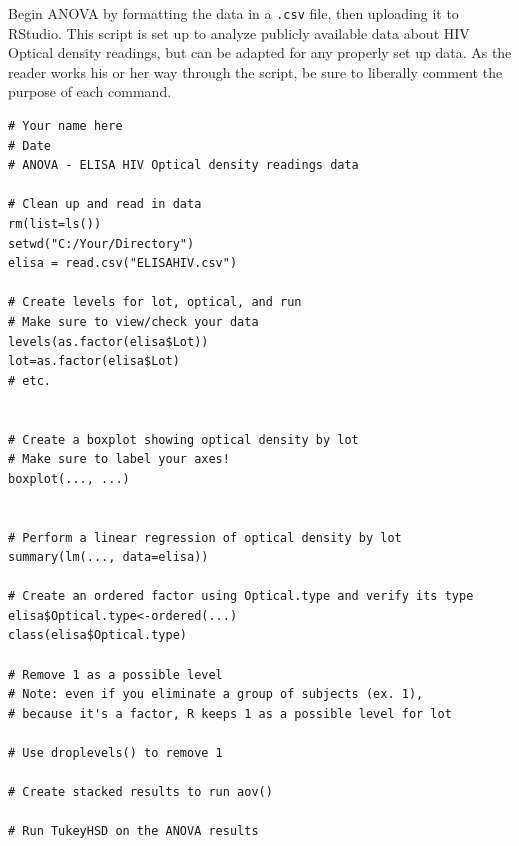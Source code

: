 Begin ANOVA by formatting the data in a \texttt{.csv} file, then uploading it to RStudio.
This script is set up to analyze publicly available data about HIV Optical density readings, but can be adapted for any properly set up data. 
As the reader works his or her way through the script, be sure to liberally comment the purpose of each command. 

\begin{lstlisting}
# Your name here
# Date
# ANOVA - ELISA HIV Optical density readings data

# Clean up and read in data
rm(list=ls())
setwd("C:/Your/Directory")
elisa = read.csv("ELISAHIV.csv")

# Create levels for lot, optical, and run
# Make sure to view/check your data
levels(as.factor(elisa$Lot))
lot=as.factor(elisa$Lot)
# etc.


# Create a boxplot showing optical density by lot
# Make sure to label your axes!
boxplot(..., ...)


# Perform a linear regression of optical density by lot
summary(lm(..., data=elisa))

# Create an ordered factor using Optical.type and verify its type
elisa$Optical.type<-ordered(...)
class(elisa$Optical.type)

# Remove 1 as a possible level
# Note: even if you eliminate a group of subjects (ex. 1),
# because it's a factor, R keeps 1 as a possible level for lot

# Use droplevels() to remove 1

# Create stacked results to run aov()

# Run TukeyHSD on the ANOVA results

\end{lstlisting}

